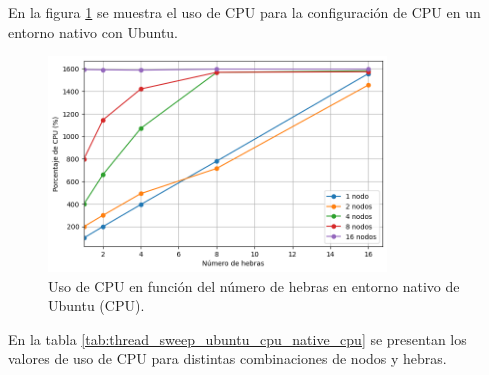 En la figura \ref{fig:thread_sweep_ubuntu_cpu_native_cpu} se muestra el uso de CPU para la configuración de CPU en un entorno nativo con Ubuntu.

\begin{figure}[H]
    \centering
    \includegraphics[width=0.8\textwidth]{imagenes/cap5/thread_sweep_ubuntu_cpu_native_cpu.png}
    \caption{Uso de CPU en función del número de hebras en entorno nativo de Ubuntu (CPU).}
    \label{fig:thread_sweep_ubuntu_cpu_native_cpu}
\end{figure}

En la tabla \ref{tab:thread_sweep_ubuntu_cpu_native_cpu} se presentan los valores de uso de CPU para distintas combinaciones de nodos y hebras.


